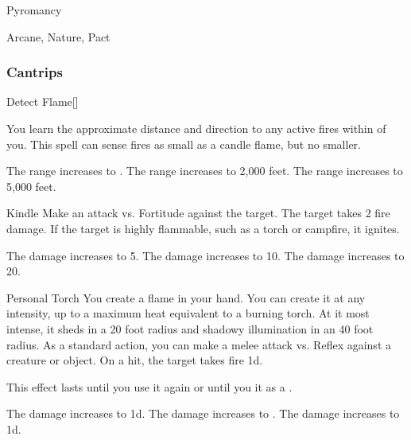 \newpage
\begin{spellsection}{Pyromancy}

\begin{spellheader}
\end{spellheader}


 Arcane, Nature, Pact

\subsubsection{Cantrips}


\begin{freeability}{Detect Flame}[]

You learn the approximate distance and direction to any active fires within \rnglong {} of you.
This spell can sense fires as small as a candle flame, but no smaller.

\rankline
{} The range increases to \rngext.
 The range increases to 2,000 feet.
 The range increases to 5,000 feet.
\end{freeability}


\begin{freeability}{Kindle}
Make an attack vs. Fortitude against the target.
\hit The target takes 2 fire damage.
If the target is highly flammable, such as a torch or campfire, it ignites.

\rankline
{} The damage increases to 5.
 The damage increases to 10.
 The damage increases to 20.
\end{freeability}


\begin{freeability}{Personal Torch}
You create a flame in your hand.
You can create it at any intensity, up to a maximum heat equivalent to a burning torch.
At it most intense, it sheds  in a 20 foot radius and shadowy illumination in an 40 foot radius.
As a standard action, you can make a melee attack vs. Reflex against a creature or object.
On a hit, the target takes fire  \minus1d.

This effect lasts until you use it again or until you  it as a .

\rankline
{} The damage increases to  \minus1d.
 The damage increases to .
 The damage increases to  \plus1d.
\end{freeability}

\end{spellsection}


